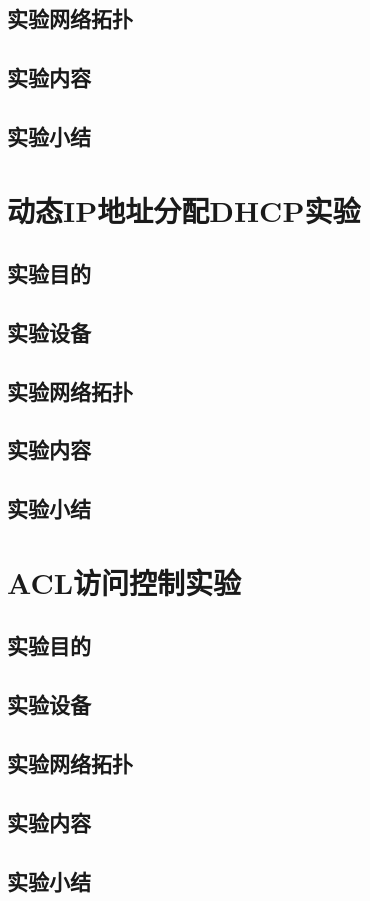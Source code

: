 \documentclass[lang=cn,11pt,a4paper,cite=authoryear]{elegantpaper}
\begin{document}
\subsection{实验网络拓扑}
\subsection{实验内容}
\subsection{实验小结}
\section{动态IP地址分配DHCP实验}
\subsection{实验目的}
\subsection{实验设备}
\subsection{实验网络拓扑}
\subsection{实验内容}
\subsection{实验小结}
\section{ACL访问控制实验}
\subsection{实验目的}
\subsection{实验设备}
\subsection{实验网络拓扑}
\subsection{实验内容}
\subsection{实验小结}
\end{document}
